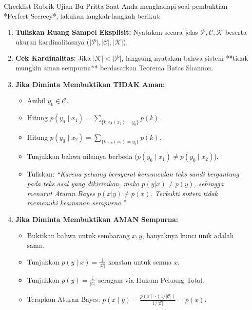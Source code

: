 \documentclass[11pt,a4paper]{article}
\begin{document}
\begin{tipsbox}{Checklist Rubrik Ujian Bu Pritta}
Saat Anda menghadapi soal pembuktian *Perfect Secrecy*, lakukan langkah-langkah berikut:
\begin{enumerate}[leftmargin=*]
    \item \textbf{Tuliskan Ruang Sampel Eksplisit:} Nyatakan secara jelas $\mathcal{P}, \mathcal{C}, \mathcal{K}$ beserta ukuran kardinalitasnya ($|\mathcal{P}|, |\mathcal{C}|, |\mathcal{K}|$).
    \item \textbf{Cek Kardinalitas:} Jika $|\mathcal{K}| < |\mathcal{P}|$, langsung nyatakan bahwa sistem **tidak mungkin aman sempurna** berdasarkan Teorema Batas Shannon.
    \item \textbf{Jika Diminta Membuktikan TIDAK Aman:}
    \begin{itemize}
        \item Ambil $y_0 \in \mathcal{C}$.
        \item Hitung $p(y_0 \mid x_1) = \sum_{\{k : e_k(x_1) = y_0\}} p(k)$.
        \item Hitung $p(y_0 \mid x_2) = \sum_{\{k : e_k(x_2) = y_0\}} p(k)$.
        \item Tunjukkan bahwa nilainya berbeda ($p(y_0 \mid x_1) \ne p(y_0 \mid x_2)$).
        \item Tuliskan: \textit{``Karena peluang bersyarat kemunculan teks sandi bergantung pada teks asal yang dikirimkan, maka $p(y|x) \ne p(y)$, sehingga menurut Aturan Bayes $p(x|y) \ne p(x)$. Terbukti sistem tidak memenuhi keamanan sempurna.''}
    \end{itemize}
    \item \textbf{Jika Diminta Membuktikan AMAN Sempurna:}
    \begin{itemize}
        \item Buktikan bahwa untuk sembarang $x, y$, banyaknya kunci unik adalah sama.
        \item Tunjukkan $p(y \mid x) = \frac{1}{|\mathcal{C}|}$ konstan untuk semua $x$.
        \item Tunjukkan $p(y) = \frac{1}{|\mathcal{C}|}$ seragam via Hukum Peluang Total.
        \item Terapkan Aturan Bayes: $p(x \mid y) = \frac{p(x) \cdot (1/|\mathcal{C}|)}{1/|\mathcal{C}|} = p(x)$.
    \end{itemize}
\end{enumerate}
\end{tipsbox}
\end{document}
